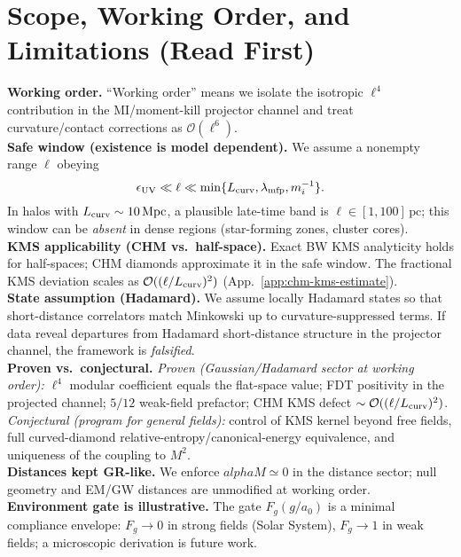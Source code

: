 \documentclass[aps,prd,onecolumn,superscriptaddress,nofootinbib]{revtex4-2}
\def\alphaM{alphaM}%
\def\alpha{alpha}%
\def\alpha_M{alphaM}%
\providecommand{\alphaM}{\alpha_M}
\begin{document}
\maketitle

\section{Scope, Working Order, and Limitations (Read First)}
\label{sec:scope}
\noindent\textbf{Working order.} ``Working order'' means we isolate the isotropic $\ell^4$ contribution in the MI/moment-kill projector channel and treat curvature/contact corrections as $\mathcal O(\ell^6)$.\\[3pt]
\noindent\textbf{Safe window (existence is model dependent).} We assume a nonempty range $\ell$ obeying
\[
\epsilon_{\rm UV}\ll \ell \ll \min\{L_{\rm curv},\lambda_{\rm mfp},m_i^{-1}\}.
\]
In halos with $L_{\rm curv}\sim 10\,\mathrm{Mpc}$, a plausible late-time band is $\ell\in[1,100]\,\mathrm{pc}$; this window can be \emph{absent} in dense regions (star-forming zones, cluster cores).\\[3pt]
\noindent\textbf{KMS applicability (CHM vs.\ half-space).} Exact BW KMS analyticity holds for half-spaces; CHM diamonds approximate it in the safe window. The fractional KMS deviation scales as $\mathcal O((\ell/L_{\rm curv})^2)$ (App.~\ref{app:chm-kms-estimate}).\\[3pt]
\noindent\textbf{State assumption (Hadamard).} We assume locally Hadamard states so that short-distance correlators match Minkowski up to curvature-suppressed terms. If data reveal departures from Hadamard short-distance structure in the projector channel, the framework is \emph{falsified}.\\[3pt]
\noindent\textbf{Proven vs.\ conjectural.} \emph{Proven (Gaussian/Hadamard sector at working order):} $\ell^4$ modular coefficient equals the flat-space value; FDT positivity in the projected channel; $5/12$ weak-field prefactor; CHM KMS defect $\sim \mathcal O((\ell/L_{\rm curv})^2)$. \emph{Conjectural (program for general fields):} control of KMS kernel beyond free fields, full curved-diamond relative-entropy/canonical-energy equivalence, and uniqueness of the coupling to $M^2$.\\[3pt]
\noindent\textbf{Distances kept GR-like.} We enforce $\alphaM\simeq 0$ in the distance sector; null geometry and EM/GW distances are unmodified at working order.\\[3pt]
\noindent\textbf{Environment gate is illustrative.} The gate $F_g(g/a_0)$ is a minimal compliance envelope: $F_g\!\to\!0$ in strong fields (Solar System), $F_g\!\to\!1$ in weak fields; a microscopic derivation is future work.\\[3pt]
\end{document}
